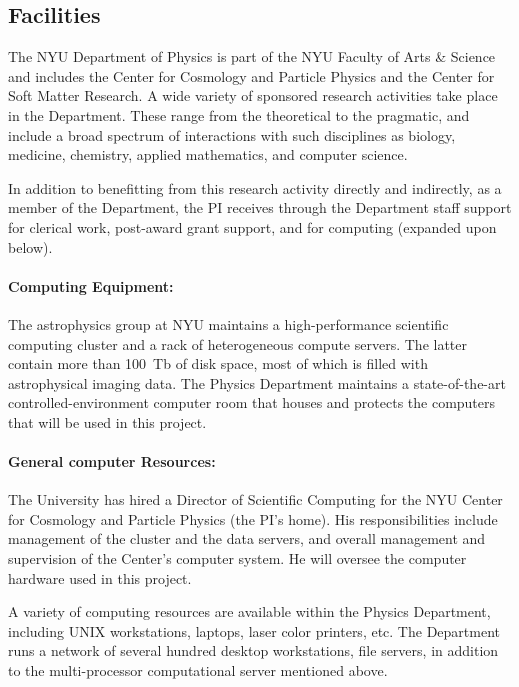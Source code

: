 \documentclass[12pt]{article}
\begin{document}
\subsection*{Facilities}

The NYU Department of Physics is part of the NYU Faculty of Arts \&
Science and includes the Center for Cosmology and Particle Physics and
the Center for Soft Matter Research.  A wide variety of sponsored
research activities take place in the Department.  These range from
the theoretical to the pragmatic, and include a broad spectrum of
interactions with such disciplines as biology, medicine, chemistry,
applied mathematics, and computer science.

In addition to benefitting from this research activity directly and
indirectly, as a member of the Department, the PI receives through the
Department staff support for clerical work, post-award grant support,
and for computing (expanded upon below).

\paragraph{Computing Equipment:}

The astrophysics group at NYU maintains a high-performance scientific
computing cluster and a rack of heterogeneous compute servers.  The
latter contain more than 100~Tb of disk space, most of which is filled
with astrophysical imaging data.  The Physics Department maintains a
state-of-the-art controlled-environment computer room that houses and
protects the computers that will be used in this project.

\paragraph{General computer Resources:}

The University has hired a Director of Scientific Computing for the
NYU Center for Cosmology and Particle Physics (the PI's home).  His
responsibilities include management of the cluster and the data
servers, and overall management and supervision of the Center's
computer system.  He will oversee the computer hardware used in this
project.

A variety of computing resources are available within the Physics
Department, including UNIX workstations, laptops, laser color
printers, etc.  The Department runs a network of several hundred
desktop workstations, file servers, in addition to the multi-processor
computational server mentioned above.
\end{document}
